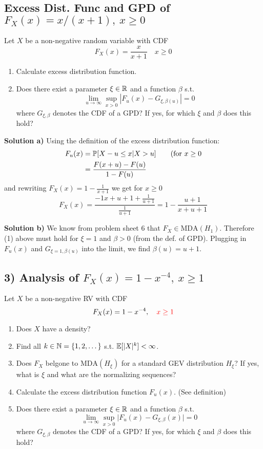 \subsection*{Excess Dist. Func and GPD of $F_X(x) = x / (x+1), \ x\geq 0$}
Let $X$ be a non-negative random variable with CDF
\[
    F_X(x) = \frac{x}{x+1} \quad x\geq 0
\]
\begin{enumerate}[label=(\alph*)]
    \item Calculate excess distribution function. \\
    \item Does there exist a parameter $\xi\in\mathbb{R}$ and a function $\beta$ s.t.
    \[
        \lim_{u\to\infty}\sup_{x > 0} | F_u(x) - G_{\xi,\beta(u)}| = 0 \tag{1}
    \]
    where $G_{\xi, \beta}$ denotes the CDF of a GPD? If yes, for which $\xi$ and $\beta$ does this hold?
\end{enumerate}
\textbf{Solution a)}
Using the definition of the excess distribution function:
\begin{align*}
    F_u(x) &= \mathbb{P}[X - u \leq x | X > u] \qquad (\text{for} \ x \geq 0 \\
          &= \frac{F(x+u) - F(u)}{1 - F(u)}
\end{align*}
and rewriting $F_X(x) = 1 - \frac{1}{x+1}$ we get for $x\geq 0$
\[
    F_X(x) = \frac{-{1}{x+u+1} + \frac{1}{u+1}}{\frac{1}{u+1}} = 1 - \frac{u+1}{x+u+1}
\]

\textbf{Solution b)}
We know from problem sheet 6 that $F_X \in \text{MDA}(H_1)$. Therefore (1) above must hold for $\xi = 1$ and $\beta > 0$ (from the def. of GPD). Plugging in $F_u(x)$ and $G_{\xi = 1, \beta(u)}$ into the limit, we find $\beta(u) = u + 1$.

%
%
\subsection*{3) Analysis of $F_X(x) = 1 - x^{-4}, \ x\geq 1$}
Let $X$ be a non-negative RV with CDF
\[
F_X(x) = 1 - x^{-4}, \quad \textcolor{red}{x \geq 1}
\]
\begin{enumerate}[label=(\alph*)]
    \item Does $X$ have a density?
    \item Find all $k\in\mathbb{N} = \{1,2,\dots\}$ s.t. $\mathbb{E}[|X|^k] < \infty$.
    \item Does $F_X$ belgone to $\text{MDA}(H_\xi)$ for a standard GEV distribution $H_\xi$?
    If yes, what is $\xi$ and what are the normalizing sequences?
    \item Calculate the excess distribution function $F_u(x)$. (See definition)
    \item Does there exist a parameter $\xi\in\mathbb{R}$ and a function $\beta$ s.t.
    \[
    \lim_{u\to\infty} \sup_{x>0} \big|F_u(x) - G_{\xi, \beta}(x)\big| = 0 \tag{1}
    \]
    where $G_{\xi,\beta}$ denotes the CDF of a GPD? If yes, for which $\xi$ and $\beta$ does this hold?
\end{enumerate}

